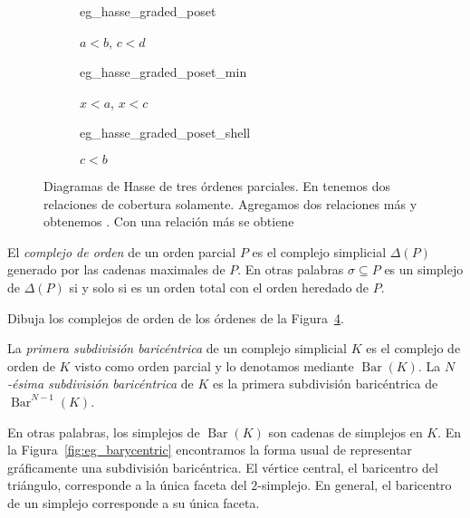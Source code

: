 \documentclass{standalone}
\begin{document}
	\begin{figure}[h]
		\centering
		\begin{subfigure}{.3\textwidth}
			\centering
			{eg_hasse_graded_poset}
			\caption{$a<b$, $c<d$}
			\label{fig:hasse_graded_poset}
		\end{subfigure}
		\begin{subfigure}{.3\textwidth}
			\centering
			{eg_hasse_graded_poset_min}
			\caption{$x<a$, $x<c$}
			\label{fig:hasse_graded_poset_min}
		\end{subfigure}
		\begin{subfigure}{.3\textwidth}
			\centering
			{eg_hasse_graded_poset_shell}
			\caption{$c<b$}
			\label{fig:hasse_graded_poset_shell}
		\end{subfigure}
		\caption{Diagramas de Hasse de tres órdenes parciales. En  tenemos dos relaciones de cobertura solamente. Agregamos dos relaciones más y obtenemos . Con una relación más se obtiene }
		\label{fig:hasse}
	\end{figure}
	
	
	\begin{definition}
		El \emph{complejo de orden} de un orden parcial $P$ es el complejo simplicial $\Delta(P)$ generado por las cadenas maximales de $P$. En otras palabras $\sigma\subseteq P$ es un simplejo de $\Delta(P)$ si y solo si es un orden total con el orden heredado de $P$.
	\end{definition}
	
	\begin{exercise}
		Dibuja los complejos de orden de los órdenes de la Figura~\ref{fig:hasse}.
	\end{exercise}
	
	\begin{definition}\label{def:barycentric_subdivision}
		La \emph{primera subdivisión baricéntrica} de un complejo simplicial $K$ es el complejo de orden de $K$ visto como orden parcial y lo denotamos mediante $\operatorname{Bar}(K)$. La \emph{$N$-ésima subdivisión baricéntrica} de $K$ es la primera subdivisión baricéntrica de $\operatorname{Bar}^{N-1}(K)$.
	\end{definition} 
	
	En otras palabras, los simplejos de $\operatorname{Bar}(K)$ son cadenas de simplejos en $K$. En la Figura~\ref{fig:eg_barycentric} encontramos la forma usual de representar gráficamente una subdivisión baricéntrica. El vértice central, el baricentro del triángulo, corresponde a la única faceta del $2$-simplejo. En general, el baricentro de un simplejo corresponde a su única faceta. 
	
\end{document}
